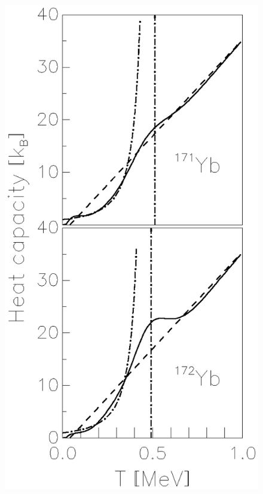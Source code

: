 \documentclass[sort&compress,final,numberedheadings]{aipproc}
\begin{document}
\begin{figure}
\includegraphics[totalheight=5cm,angle=0,bb=151 141 402 608,clip]{fig5b.ps}
\hspace*{1.5cm}

\end{figure}
\end{document}

